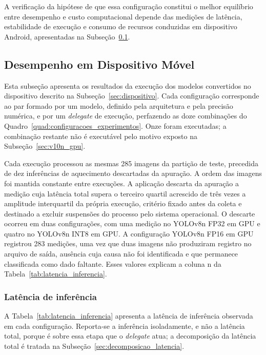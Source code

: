 \documentclass[artigo,times,capa]{iftex2024}
\begin{document}
A verificação da hipótese de que essa configuração constitui o melhor equilíbrio entre desempenho e custo computacional depende das medições de latência, estabilidade de execução e consumo de recursos conduzidas em dispositivo Android, apresentadas na Subseção~\ref{sec:resultados_movel}.

\subsection{Desempenho em Dispositivo Móvel}
\label{sec:resultados_movel}

Esta subseção apresenta os resultados da execução dos modelos convertidos no dispositivo descrito na Subseção~\ref{sec:dispositivo}. Cada configuração corresponde ao par formado por um modelo, definido pela arquitetura e pela precisão numérica, e por um \textit{delegate} de execução, perfazendo as doze combinações do Quadro~\ref{quad:configuracoes_experimentos}. Onze foram executadas; a combinação restante não é executável pelo motivo exposto na Subseção~\ref{sec:v10n_gpu}.

Cada execução processou as mesmas 285 imagens da partição de teste, precedida de dez inferências de aquecimento descartadas da apuração. A ordem das imagens foi mantida constante entre execuções. A aplicação descarta da apuração a medição cuja latência total supera o terceiro quartil acrescido de três vezes a amplitude interquartil da própria execução, critério fixado antes da coleta e destinado a excluir suspensões do processo pelo sistema operacional. O descarte ocorreu em duas configurações, com uma medição no YOLOv8n \ac{FP32} em \ac{GPU} e quatro no YOLOv8n \ac{INT8} em \ac{GPU}. A configuração YOLOv8n \ac{FP16} em \ac{GPU} registrou 283 medições, uma vez que duas imagens não produziram registro no arquivo de saída, ausência cuja causa não foi identificada e que permanece classificada como dado faltante. Esses valores explicam a coluna n da Tabela~\ref{tab:latencia_inferencia}.

\subsubsection{Latência de inferência}
\label{sec:latencia_inferencia}

A Tabela~\ref{tab:latencia_inferencia} apresenta a latência de inferência observada em cada configuração. Reporta-se a inferência isoladamente, e não a latência total, porque é sobre essa etapa que o \textit{delegate} atua; a decomposição da latência total é tratada na Subseção~\ref{sec:decomposicao_latencia}.
\end{document}
